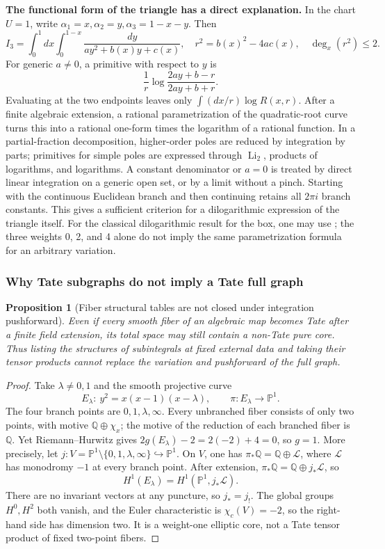 \documentclass[11pt,a4paper,oneside]{article}
\theoremstyle{plain}
\newtheorem{proposition}[theorem]{Proposition}
\theoremstyle{definition}
\theoremstyle{remark}
\newcommand{\Q}{\mathbb Q}
\numberwithin{equation}{section}
\begin{document}
\textbf{The functional form of the triangle has a direct explanation.}
In the chart $U=1$, write $\alpha_1=x,\alpha_2=y,\alpha_3=1-x-y$. Then
\[
 I_3=\int_0^1dx\int_0^{1-x}\frac{dy}{a y^2+b(x)y+c(x)},
 \quad r^2=b(x)^2-4ac(x),\quad\deg_x(r^2)\le2.
\]
For generic $a\ne0$, a primitive with respect to $y$ is
\[
 \frac1r\log\frac{2ay+b-r}{2ay+b+r}.
\]
Evaluating at the two endpoints leaves only $\int(dx/r)\log R(x,r)$.
After a finite algebraic extension, a rational parametrization of the quadratic-root curve
turns this into a rational one-form times the logarithm of a rational function.
In a partial-fraction decomposition, higher-order poles are reduced by integration by parts; primitives for simple poles are expressed through
$\operatorname{Li}_2$, products of logarithms, and logarithms.
A constant denominator or $a=0$ is treated by direct linear integration on a generic open set, or by a limit without a pinch.
Starting with the continuous Euclidean branch and then continuing retains all $2\pi i$ branch constants.
This gives a sufficient criterion for a dilogarithmic expression of the triangle itself.
For the classical dilogarithmic result for the box, one may use \cite[\S8--9]{bkone};
the three weights 0, 2, and 4 alone do not imply the same parametrization formula for an arbitrary variation.

\subsubsection{Why Tate subgraphs do not imply a Tate full graph}
\begin{proposition}[Fiber structural tables are not closed under integration pushforward]\label{unified:prop:fiberwarning}
Even if every smooth fiber of an algebraic map becomes Tate after a finite field extension,
its total space may still contain a non-Tate pure core.
Thus listing the structures of subintegrals at fixed external data and taking their tensor products
cannot replace the variation and pushforward of the full graph.
\end{proposition}
\begin{proof}
Take $\lambda\ne0,1$ and the smooth projective curve
\[
 E_\lambda:\ y^2=x(x-1)(x-\lambda),\qquad
 \pi:E_\lambda\longrightarrow\mathbb P^1.
\]
The four branch points are $0,1,\lambda,\infty$.
Every unbranched fiber consists of only two points, with motive $\Q\oplus\chi_x$;
the motive of the reduction of each branched fiber is $\Q$.
Yet Riemann--Hurwitz gives $2g(E_\lambda)-2=2(-2)+4=0$, so $g=1$.
More precisely, let $j:V=\mathbb P^1\setminus\{0,1,\lambda,\infty\}\hookrightarrow\mathbb P^1$.
On $V$, one has $\pi_*\Q=\Q\oplus\mathcal L$,
where $\mathcal L$ has monodromy $-1$ at every branch point.
After extension, $\pi_*\Q=\Q\oplus j_*\mathcal L$, so
\[
 H^1(E_\lambda)=H^1(\mathbb P^1,j_*\mathcal L).
\]
There are no invariant vectors at any puncture, so $j_*=j_!$. The global groups $H^0,H^2$ both vanish,
and the Euler characteristic is $\chi_c(V)=-2$, so the right-hand side has dimension two.
It is a weight-one elliptic core, not a Tate tensor product of fixed two-point fibers.
\end{proof}
\end{document}
